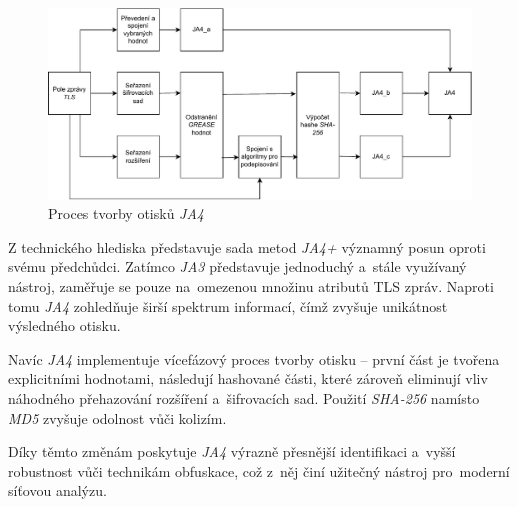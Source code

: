 \begin{figure}[H]
	\centering
	\includegraphics[width=\textwidth]{obrazky-figures/ja4-creation.drawio-crop.pdf}
	\caption{Proces tvorby otisků \textit{JA4}}
	\label{fig:JA4-creation}
\end{figure}

Z technického hlediska představuje sada metod \textit{JA4+} významný posun oproti svému předchůdci. Zatímco \textit{JA3} představuje jednoduchý a~stále využívaný nástroj, zaměřuje se pouze na~omezenou množinu atributů TLS zpráv. Naproti tomu \textit{JA4} zohledňuje širší spektrum informací, čímž zvyšuje unikátnost výsledného otisku.

Navíc \textit{JA4} implementuje vícefázový proces tvorby otisku – první část je tvořena explicitními hodnotami, následují hashované části, které zároveň eliminují vliv náhodného přehazování rozšíření a~šifrovacích sad. Použití \textit{SHA-256} namísto \textit{MD5} zvyšuje odolnost vůči kolizím.

Díky těmto změnám poskytuje \textit{JA4} výrazně přesnější identifikaci a~vyšší robustnost vůči technikám obfuskace, což z~něj činí užitečný nástroj pro~moderní síťovou analýzu.
